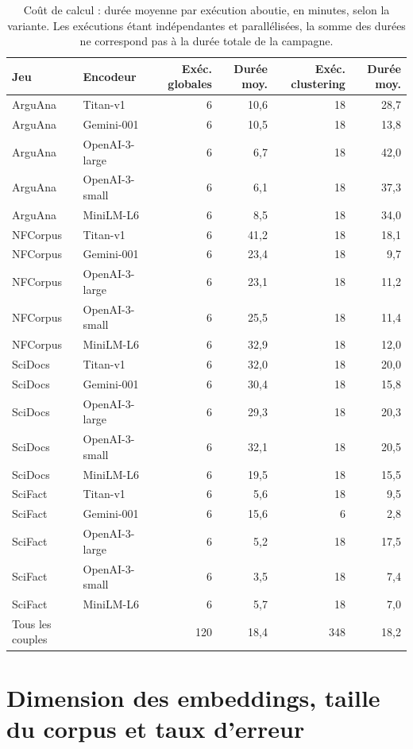 \documentclass[a4paper,10pt]{article}
\begin{document}
\begin{table}[p]
\centering
\small
\begin{tabular}{llrrrr}
\toprule
Jeu & Encodeur & Exéc. globales & Durée moy. & Exéc. clustering & Durée moy. \\
\midrule
ArguAna & Titan-v1 & 6 & 10,6 & 18 & 28,7 \\
ArguAna & Gemini-001 & 6 & 10,5 & 18 & 13,8 \\
ArguAna & OpenAI-3-large & 6 & 6,7 & 18 & 42,0 \\
ArguAna & OpenAI-3-small & 6 & 6,1 & 18 & 37,3 \\
ArguAna & MiniLM-L6 & 6 & 8,5 & 18 & 34,0 \\
\midrule
NFCorpus & Titan-v1 & 6 & 41,2 & 18 & 18,1 \\
NFCorpus & Gemini-001 & 6 & 23,4 & 18 & 9,7 \\
NFCorpus & OpenAI-3-large & 6 & 23,1 & 18 & 11,2 \\
NFCorpus & OpenAI-3-small & 6 & 25,5 & 18 & 11,4 \\
NFCorpus & MiniLM-L6 & 6 & 32,9 & 18 & 12,0 \\
\midrule
SciDocs & Titan-v1 & 6 & 32,0 & 18 & 20,0 \\
SciDocs & Gemini-001 & 6 & 30,4 & 18 & 15,8 \\
SciDocs & OpenAI-3-large & 6 & 29,3 & 18 & 20,3 \\
SciDocs & OpenAI-3-small & 6 & 32,1 & 18 & 20,5 \\
SciDocs & MiniLM-L6 & 6 & 19,5 & 18 & 15,5 \\
\midrule
SciFact & Titan-v1 & 6 & 5,6 & 18 & 9,5 \\
SciFact & Gemini-001 & 6 & 15,6 & 6 & 2,8 \\
SciFact & OpenAI-3-large & 6 & 5,2 & 18 & 17,5 \\
SciFact & OpenAI-3-small & 6 & 3,5 & 18 & 7,4 \\
SciFact & MiniLM-L6 & 6 & 5,7 & 18 & 7,0 \\
\midrule
Tous les couples &  & 120 & 18,4 & 348 & 18,2 \\
\bottomrule
\end{tabular}
\caption{Coût de calcul : durée moyenne par exécution aboutie, en minutes, selon la variante. Les exécutions étant indépendantes et parallélisées, la somme des durées ne correspond pas à la durée totale de la campagne.}
\label{tab:s-durees}
\end{table}


\section{Dimension des embeddings, taille du corpus et taux d'erreur}
\end{document}
